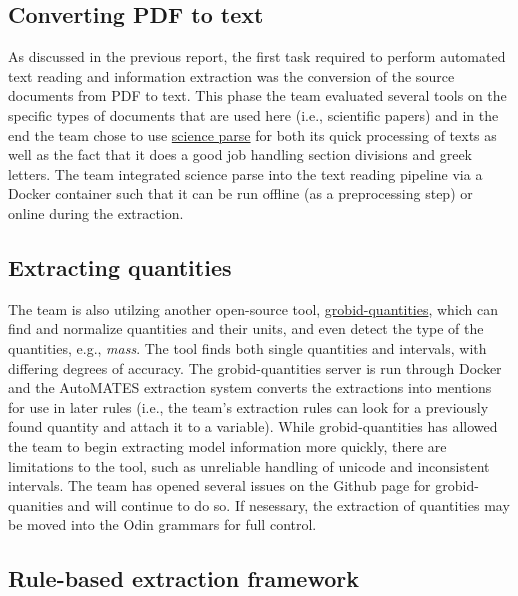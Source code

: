 \documentclass[article, 12pt, oneside]{memoir}
\begin{document}
\hypertarget{converting-pdf-to-text}{%
\subsection{Converting PDF to text}\label{converting-pdf-to-text}}

As discussed in the previous report, the first task required to perform
automated text reading and information extraction was the conversion of
the source documents from PDF to text. This phase the team evaluated
several tools on the specific types of documents that are used here
(i.e., scientific papers) and in the end the team chose to use
\href{https://github.com/allenai/science-parse}{science parse} for both
its quick processing of texts as well as the fact that it does a good
job handling section divisions and greek letters. The team integrated
science parse into the text reading pipeline via a Docker container such
that it can be run offline (as a preprocessing step) or online during
the extraction.

\hypertarget{extracting-quantities}{%
\subsection{Extracting quantities}\label{extracting-quantities}}

The team is also utilzing another open-source tool,
\href{https://github.com/kermitt2/grobid-quantities}{grobid-quantities},
which can find and normalize quantities and their units, and even detect
the type of the quantities, e.g., \emph{mass}. The tool finds both
single quantities and intervals, with differing degrees of accuracy. The
grobid-quantities server is run through Docker and the AutoMATES
extraction system converts the extractions into mentions for use in
later rules (i.e., the team's extraction rules can look for a previously
found quantity and attach it to a variable). While grobid-quantities has
allowed the team to begin extracting model information more quickly,
there are limitations to the tool, such as unreliable handling of
unicode and inconsistent intervals. The team has opened several issues
on the Github page for grobid-quanities and will continue to do so. If
nesessary, the extraction of quantities may be moved into the Odin
grammars for full control.

\hypertarget{rule-based-extraction-framework}{%
\subsection{Rule-based extraction
framework}\label{rule-based-extraction-framework}}
\end{document}

